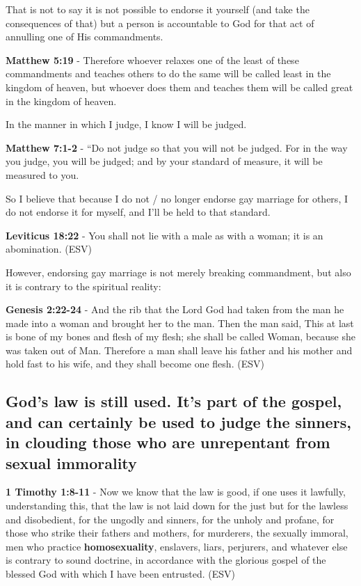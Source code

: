 \documentclass[11pt]{article}
\begin{document}
That is not to say it is not possible to endorse it yourself (and take the consequences of that) but a person is accountable to God for that act of annulling one of His commandments.

\textbf{Matthew 5:19} - Therefore whoever relaxes one of the least of these commandments and teaches others to do the same will be called least in the kingdom of heaven, but whoever does them and teaches them will be called great in the kingdom of heaven.

In the manner in which I judge, I know I will be judged.

\textbf{Matthew 7:1-2} - “Do not judge so that you will not be judged. For in the way you judge, you will be judged; and by your standard of measure, it will be measured to you.

So I believe that because I do not / no longer
endorse gay marriage for others, I do not
endorse it for myself, and I'll be held to
that standard.

\textbf{Leviticus 18:22} - You shall not lie with a male as with a woman; it is an abomination. (ESV)

However, endorsing gay marriage is not merely breaking commandment, but also it is contrary to the spiritual reality:

\textbf{Genesis 2:22-24} - And the rib that the Lord God had taken from the man he made into a woman and brought her to the man. Then the man said, This at last is bone of my bones and flesh of my flesh; she shall be called Woman, because she was taken out of Man. Therefore a man shall leave his father and his mother and hold fast to his wife, and they shall become one flesh. (ESV)

\subsection{God's law is still used. It's part of the gospel, and can certainly be used to judge the sinners, in clouding those who are unrepentant from sexual immorality}
\label{sec:orgad869e5}
\textbf{1 Timothy 1:8-11} - Now we know that the law is good, if one uses it lawfully, understanding this, that the law is not laid down for the just but for the lawless and disobedient, for the ungodly and sinners, for the unholy and profane, for those who strike their fathers and mothers, for murderers, the sexually immoral, men who practice \textbf{homosexuality}, enslavers, liars, perjurers, and whatever else is contrary to sound doctrine, in accordance with the glorious gospel of the blessed God with which I have been entrusted. (ESV)
\end{document}
